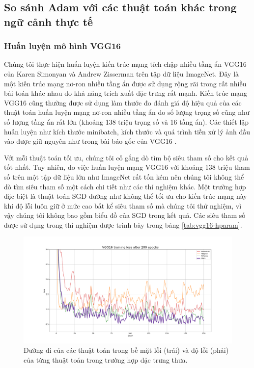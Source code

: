 \subsection{So sánh Adam với các thuật toán khác trong ngữ cảnh thực tế}

\subsubsection{Huấn luyện mô hình VGG16}
\label{exp:vgg16}

Chúng tôi thực hiện huấn luyện kiến trúc mạng tích chập nhiều tầng ẩn VGG16 của Karen Simonyan và Andrew Zisserman \cite{simonyan2014verydeep} trên tập dữ liệu ImageNet. Đây là một kiến trúc mạng nơ-ron nhiều tầng ẩn được sử dụng rộng rãi trong rất nhiều bài toán khác nhau do khả năng trích xuất đặc trưng rất mạnh. Kiến trúc mạng VGG16 cũng thường được sử dụng làm thước đo đánh giá độ hiệu quả của các thuật toán huấn luyện mạng nơ-ron nhiều tầng ẩn \cite{zhuang2020adabelief}\cite{schneider2018deepobs} do số lượng trọng số cũng như số lượng tầng ẩn rất lớn (khoảng 138 triệu trọng số và 16 tầng ẩn). Các thiết lập huấn luyện như kích thước minibatch, kích thước và quá trình tiền xử lý ảnh đầu vào được giữ nguyên như trong bài báo gốc của VGG16 \cite{simonyan2014verydeep}.

Với mỗi thuật toán tối ưu, chúng tôi cố gắng dò tìm bộ siêu tham số cho kết quả tốt nhất. Tuy nhiên, do việc huấn luyện mạng VGG16 với khoảng 138 triệu tham số trên một tập dữ liệu lớn như ImageNet rất tốn kém nên chúng tôi không thể dò tìm siêu tham số một cách chi tiết như các thí nghiệm khác. Một trường hợp đặc biệt là thuật toán SGD dường như không thể tối ưu cho kiến trúc mạng này khi độ lỗi luôn giữ ở mức cao bất kể siêu tham số mà chúng tôi thử nghiệm, vì vậy chúng tôi không bao gồm biểu đồ của SGD trong kết quả. Các siêu tham số được sử dụng trong thí nghiệm được trình bày trong bảng \ref{tab:vgg16-hparam}.

\begin{figure}[htp]
	\centering
	\includegraphics[width=140 mm]{images/vgg16.png}
	\caption{Đường đi của các thuật toán trong bề mặt lỗi (trái) và độ lỗi (phải) của từng thuật toán trong trường hợp đặc trưng thưa.}
	\label{fig:vgg16-loss}
\end{figure}

